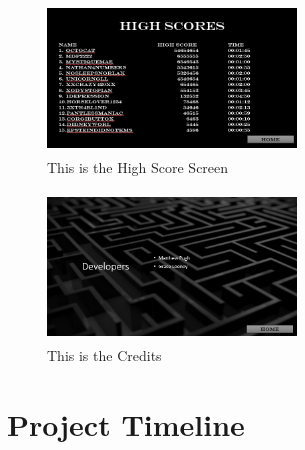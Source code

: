 \documentclass[10pt,conference,onecolumn,compsoc]{IEEEtran}
\begin{document}
\begin{figure}[ht!]
\includegraphics[height=150px, width=250px]{interface/Interface-HighScores.png}
\caption{This is the High Score Screen}
\label{High Scores}
\end{figure}
\begin{figure}[ht!]
\includegraphics[height=150px, width=250px]{interface/Interface-Credits.png}
\caption{This is the Credits}
\label{Credits}
\end{figure}
\clearpage
\section{Project Timeline}
\end{document}
